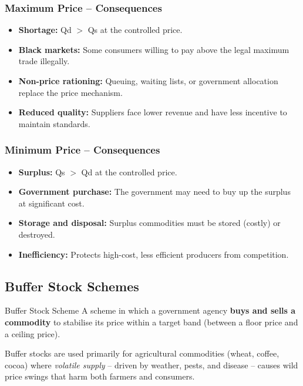 \documentclass[11pt, a4paper, twoside]{book}
\begin{document}
\subsubsection{Maximum Price -- Consequences}

\begin{itemize}
  \item \textbf{Shortage:} Qd $>$ Qs at the controlled price.
  \item \textbf{Black markets:} Some consumers willing to pay above the legal maximum trade illegally.
  \item \textbf{Non-price rationing:} Queuing, waiting lists, or government allocation replace the price mechanism.
  \item \textbf{Reduced quality:} Suppliers face lower revenue and have less incentive to maintain standards.
\end{itemize}

\subsubsection{Minimum Price -- Consequences}

\begin{itemize}
  \item \textbf{Surplus:} Qs $>$ Qd at the controlled price.
  \item \textbf{Government purchase:} The government may need to buy up the surplus at significant cost.
  \item \textbf{Storage and disposal:} Surplus commodities must be stored (costly) or destroyed.
  \item \textbf{Inefficiency:} Protects high-cost, less efficient producers from competition.
\end{itemize}

\subsection{Buffer Stock Schemes}

\begin{keyterm}{Buffer Stock Scheme}
A scheme in which a government agency \textbf{buys and sells a commodity} to stabilise its price within a target band (between a floor price and a ceiling price).
\end{keyterm}

Buffer stocks are used primarily for agricultural commodities (wheat, coffee, cocoa) where \emph{volatile supply} -- driven by weather, pests, and disease -- causes wild price swings that harm both farmers and consumers.
\end{document}
